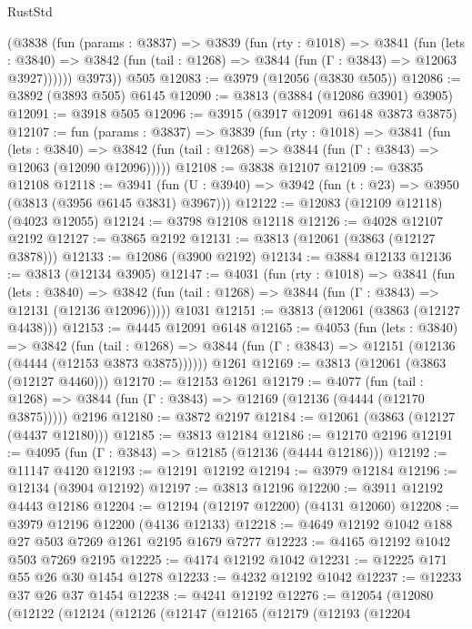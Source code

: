 \begin{lexlean}{RustStd}
\begin{coremodule}
        (@3838
          (fun (params : @3837) =>
          @3839
            (fun (rty : @1018) =>
            @3841
              (fun (lets : @3840) =>
              @3842 (fun (tail : @1268) => @3844 (fun (Γ : @3843) => @12063 @3927))))))
        @3973))
    @505
@12083 := @3979 (@12056 (@3830 @505))
@12086 := @3892 (@3893 @505) @6145
@12090 := @3813 (@3884 (@12086 @3901) @3905)
@12091 := @3918 @505
@12096 := @3915 (@3917 @12091 @6148 @3873 @3875)
@12107 := fun (params : @3837) =>
  @3839
    (fun (rty : @1018) =>
    @3841
      (fun (lets : @3840) =>
      @3842 (fun (tail : @1268) => @3844 (fun (Γ : @3843) => @12063 (@12090 @12096)))))
@12108 := @3838 @12107
@12109 := @3835 @12108
@12118 := @3941
    (fun (U : @3940) => @3942 (fun (t : @23) => @3950 (@3813 (@3956 @6145 @3831) @3967)))
@12122 := @12083 (@12109 @12118) (@4023 @12055)
@12124 := @3798 @12108 @12118
@12126 := @4028 @12107 @2192
@12127 := @3865 @2192
@12131 := @3813 (@12061 (@3863 (@12127 @3878)))
@12133 := @12086 (@3900 @2192)
@12134 := @3884 @12133
@12136 := @3813 (@12134 @3905)
@12147 := @4031
    (fun (rty : @1018) =>
    @3841
      (fun (lets : @3840) =>
      @3842 (fun (tail : @1268) => @3844 (fun (Γ : @3843) => @12131 (@12136 @12096)))))
    @1031
@12151 := @3813 (@12061 (@3863 (@12127 @4438)))
@12153 := @4445 @12091 @6148
@12165 := @4053
    (fun (lets : @3840) =>
    @3842
      (fun (tail : @1268) =>
      @3844 (fun (Γ : @3843) => @12151 (@12136 (@4444 (@12153 @3873 @3875))))))
    @1261
@12169 := @3813 (@12061 (@3863 (@12127 @4460)))
@12170 := @12153 @1261
@12179 := @4077
    (fun (tail : @1268) => @3844 (fun (Γ : @3843) => @12169 (@12136 (@4444 (@12170 @3875)))))
    @2196
@12180 := @3872 @2197
@12184 := @12061 (@3863 (@12127 (@4437 @12180)))
@12185 := @3813 @12184
@12186 := @12170 @2196
@12191 := @4095 (fun (Γ : @3843) => @12185 (@12136 (@4444 @12186)))
@12192 := @11147 @4120
@12193 := @12191 @12192
@12194 := @3979 @12184
@12196 := @12134 (@3904 @12192)
@12197 := @3813 @12196
@12200 := @3911 @12192 @4443 @12186
@12204 := @12194 (@12197 @12200) (@4131 @12060)
@12208 := @3979 @12196 @12200 (@4136 @12133)
@12218 := @4649 @12192 @1042 @188 @27 @503 @7269 @1261 @2195 @1679 @7277
@12223 := @4165 @12192 @1042 @503 @7269 @2195
@12225 := @4174 @12192 @1042
@12231 := @12225 @171 @55 @26 @30 @1454 @1278
@12233 := @4232 @12192 @1042
@12237 := @12233 @37 @26 @37 @1454
@12238 := @4241 @12192
@12276 := @12054
    (@12080
      (@12122
        (@12124
          (@12126
            (@12147
              (@12165
                (@12179
                  (@12193
                    (@12204

\end{coremodule}
\end{lexlean}
